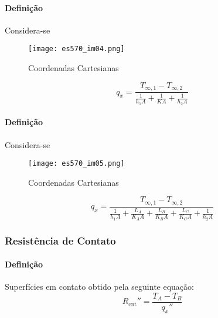 \documentclass{article}
\begin{document}
            \paragraph{Definição}Considera-se
                \begin{figure}[H]
                    \centering
                    \texttt{[image: es570\_im04.png]}
                    \caption{Coordenadas Cartesianas}
                \end{figure} \noindent
                \begin{equation}
                    \boxed{
                            q_{x} = \frac{
                            T_{\infty,1} - T_{\infty,2}
                        }{
                            \frac{1}{h_{1}A} + 
                            \frac{1}{KA} + 
                            \frac{1}{h_{2}A}
                        }
                    }
                \end{equation}

            \paragraph{Definição}Considera-se
                \begin{figure}[H]
                    \centering
                    \texttt{[image: es570\_im05.png]}
                    \caption{Coordenadas Cartesianas}
                \end{figure} \noindent
                \begin{equation}
                    \boxed{
                            q_{x} = \frac{
                            T_{\infty,1} - T_{\infty,2}
                        }{
                            \frac{1}{h_{1}A} + 
                            \frac{L_{A}}{K_{A}A} + 
                            \frac{L_{B}}{K_{B}A} + 
                            \frac{L_{C}}{K_{C}A} + 
                            \frac{1}{h_{2}A}
                        }
                    }
                \end{equation}

        \subsubsection{Resistência de Contato}
            \paragraph{Definição}Superfícies em contato obtido pela seguinte equação:
                \begin{equation}
                    \boxed{
                        R_{\text{cnt}}'' = \frac{T_{A} - T_{B}}{q_{x}''}
                    }
                \end{equation}
\end{document}
